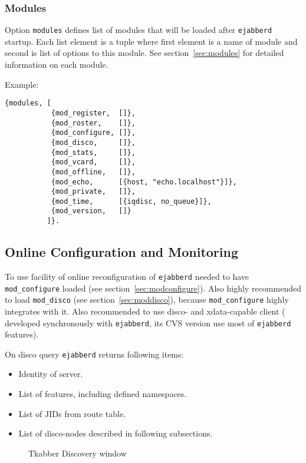 \documentclass[10pt]{article}
\newcommand{\imgscale}{0.58}
\newcommand{\insimg}[1]{\insscaleimg{\imgscale}{#1}}
\newcommand{\insscaleimg}[2]{
  \imgsrc{#2}{}
  \begin{latexonly}
    \scalebox{#1}{\texttt{[image: \#2]}}
  \end{latexonly}
}
\newcommand{\ejabberd}{\texttt{ejabberd}}
\newcommand{\modconfigure}{\texttt{mod\_configure}}
\newcommand{\moddisco}{\texttt{mod\_disco}}
\begin{document}
\subsubsection{Modules}
\label{sec:configmodules}

Option \texttt{modules} defines list of modules that will be loaded after
\ejabberd{} startup.  Each list element is a tuple where first element is a
name of module and second is list of options to this module.  See
section~\ref{sec:modules} for detailed information on each module.

Example:
\begin{verbatim}
{modules, [
           {mod_register,  []},
           {mod_roster,    []},
           {mod_configure, []},
           {mod_disco,     []},
           {mod_stats,     []},
           {mod_vcard,     []},
           {mod_offline,   []},
           {mod_echo,      [{host, "echo.localhost"}]},
           {mod_private,   []},
           {mod_time,      [{iqdisc, no_queue}]},
           {mod_version,   []}
          ]}.
\end{verbatim}


\subsection{Online Configuration and Monitoring}
\label{sec:onlineconfig}

To use facility of online reconfiguration of \ejabberd{} needed to have
\modconfigure{} loaded (see section~\ref{sec:modconfigure}).  Also highly
recommended to load \moddisco{} (see section~\ref{sec:moddisco}), because
\modconfigure{} highly integrates with it.  Also recommended to use disco- and
xdata-capable client
(
developed synchronously with \ejabberd{}, its CVS version use most of
\ejabberd{} features).

On disco query \ejabberd{} returns following items:
\begin{itemize}
\item Identity of server.
\item List of features, including defined namespaces.
\item List of JIDs from route table.
\item List of disco-nodes described in following subsections.
\end{itemize}
\begin{figure}[htbp]
  \centering
  \insimg{disco.png}
  \caption{Tkabber Discovery window}
  \label{fig:disco}
\end{figure}
\end{document}
